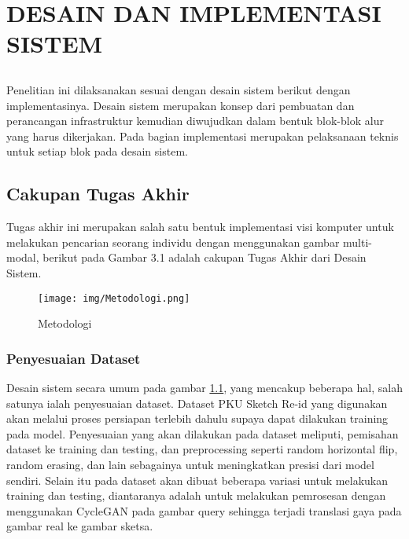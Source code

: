 \chapter{DESAIN DAN IMPLEMENTASI SISTEM}
\vspace{1ex}

\section*{}
	Penelitian ini dilaksanakan sesuai dengan desain sistem berikut dengan implementasinya. Desain sistem merupakan konsep dari pembuatan dan perancangan infrastruktur kemudian diwujudkan dalam bentuk blok-blok alur yang harus dikerjakan. Pada bagian implementasi merupakan pelaksanaan teknis untuk setiap blok pada desain sistem.
\vspace{1ex}

\section{Cakupan Tugas Akhir}
\vspace{1ex}

	Tugas akhir ini merupakan salah satu bentuk implementasi visi komputer untuk melakukan pencarian seorang individu dengan menggunakan gambar multi-modal, berikut pada Gambar 3.1 adalah cakupan Tugas Akhir dari Desain Sistem.
\begin{figure}  [!htb]
	\captionsetup{justification=centering}
	\texttt{[image: img/Metodologi.png]}
	\caption{Metodologi}
	\label{fig: 3_1}
\end{figure}
\vspace{1ex}
    \subsection{Penyesuaian Dataset}
    Desain sistem secara umum pada gambar \ref{fig: 3_1}, yang mencakup beberapa hal, salah satunya ialah penyesuaian dataset. Dataset PKU Sketch \cite{cit:15} Re-id yang digunakan akan melalui proses persiapan terlebih dahulu supaya dapat dilakukan training pada model. Penyesuaian yang akan dilakukan pada dataset meliputi, pemisahan dataset ke training dan testing, dan preprocessing seperti random horizontal flip, random erasing, dan lain sebagainya untuk meningkatkan presisi dari model sendiri. Selain itu pada dataset akan dibuat beberapa variasi untuk melakukan training dan testing, diantaranya adalah untuk melakukan pemrosesan dengan menggunakan CycleGAN pada gambar query sehingga terjadi translasi gaya pada gambar real ke gambar sketsa. 
    
